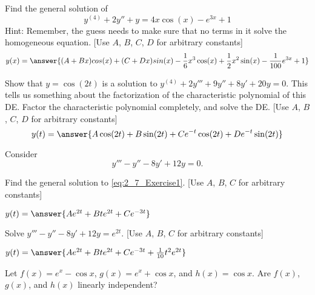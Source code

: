 \documentclass{ximera}
\begin{document}
\begin{exercise}
    Find the general solution of 
    \begin{equation*}
        y^{(4)}  + 2y'' + y = 4x\cos(x) - e^{3x} + 1
    \end{equation*}
    Hint: Remember, the guess needs to make sure that no terms in it solve the homogeneous equation.
    [Use $A$, $B$, $C$, $D$ for arbitrary constants]
    \[
        y(x) = \answer{(A + Bx)cos(x) + (C + Dx)sin(x) - \frac{1}{6}x^3\cos(x) + \frac{1}{2}x^2\sin(x) - \frac{1}{100}e^{3x} + 1}
    \]
\end{exercise}


\begin{exercise}
    Show that $y=\cos(2t)$ is a solution to $y^{(4)}+2y'''+9y''+8y'+20y=0$. %
    This tells us something about the factorization of the characteristic polynomial of this DE. Factor the characteristic polynomial completely, and solve the DE.
    [Use $A$, $B$, $C$, $D$ for arbitrary constants]
    \[
        y(t) = \answer{A\cos(2t) + B\sin(2t) + Ce^{-t}\cos(2t) + De^{-t}\sin(2t)}
    \]
\end{exercise}

\begin{exercise}
    Consider 
    \begin{equation}
        y'''-y''-8y'+12y=0. \label{eq:2_7_Exercise1}
    \end{equation}
    
    Find the general solution to \eqref{eq:2_7_Exercise1}. [Use $A$, $B$, $C$ for arbitrary constants]
    
    $y(t) = \answer{Ae^{2t} + Bte^{2t} + Ce^{-3t}}$
    \begin{problem}
        Solve $y'''-y''-8y'+12y=e^{2t}$. [Use $A$, $B$, $C$ for arbitrary constants] 
        
        $y(t) = \answer{Ae^{2t} + Bte^{2t} + Ce^{-3t} + \frac{1}{10}t^2e^{2t}}$
    \end{problem}
\end{exercise}

\begin{exercise}
    Let $f(x) = e^x - \cos x$, $g(x) = e^x + \cos x$, and $h(x) = \cos x$. Are $f(x)$, $g(x)$, and $h(x)$ linearly independent?  
    \begin{multipleChoice}
    \end{multipleChoice}
\end{exercise}
\end{document}
